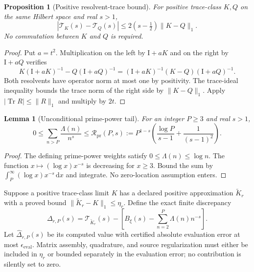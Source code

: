 \documentclass[11pt,letterpaper]{article}
\numberwithin{equation}{section}
\newtheorem{proposition}[theorem]{Proposition}
\newtheorem{lemma}[theorem]{Lemma}
\theoremstyle{definition}
\theoremstyle{remark}
\newcommand{\Id}{\mathrm I}
\newcommand{\dd}{\,\mathrm d}
\DeclareMathOperator{\Tr}{Tr}
\begin{document}
\begin{proposition}[Positive resolvent-trace bound]
\label{prop:resolventbound}
For positive trace-class $K,Q$ on the same Hilbert space and real $s>1$,
\begin{equation}
 |\mathcal T_K(s)-\mathcal T_Q(s)|
 \leq2(s-\tfrac12)\|K-Q\|_1.
 \label{eq:resolventtracebound}
\end{equation}
No commutation between $K$ and $Q$ is required.
\end{proposition}
\begin{proof}
Put $a=t^2$. Multiplication on the left by $\Id+aK$ and on the right by $\Id+aQ$ verifies
\begin{equation}
 K(\Id+aK)^{-1}-Q(\Id+aQ)^{-1}
 =(\Id+aK)^{-1}(K-Q)(\Id+aQ)^{-1}.
 \label{eq:noncommutingresolvent}
\end{equation}
Both resolvents have operator norm at most one by positivity. The trace-ideal inequality bounds the trace norm of the right side by $\|K-Q\|_1$. Apply $|\Tr R|\leq\|R\|_1$ and multiply by $2t$.
\end{proof}

\begin{lemma}[Unconditional prime-power tail]
\label{lem:primetail}
For an integer $P\geq3$ and real $s>1$,
\begin{equation}
 0\leq\sum_{n>P}\frac{\Lambda(n)}{n^s}
 \leq \mathcal R_{\mathrm{pr}}(P,s)
 :=P^{1-s}\left(\frac{\log P}{s-1}+\frac1{(s-1)^2}\right).
 \label{eq:primetail}
\end{equation}
\end{lemma}
\begin{proof}
The defining prime-power weights satisfy $0\leq\Lambda(n)\leq\log n$. The function $x\mapsto(\log x)x^{-s}$ is decreasing for $x\geq3$. Bound the sum by $\int_P^\infty(\log x)x^{-s}\dd x$ and integrate. No zero-location assumption enters.
\end{proof}

Suppose a positive trace-class limit $K$ has a declared positive approximation $\widetilde K_r$ with a proved bound $\|\widetilde K_r-K\|_1\leq\eta_r$. Define the exact finite discrepancy
\begin{equation}
 \Delta_{r,P}(s)=\mathcal T_{\widetilde K_r}(s)
 -\left[B_\xi(s)-\sum_{n=2}^{P}\Lambda(n)n^{-s}\right].
 \label{eq:finitediscrepancy}
\end{equation}
Let $\widehat\Delta_{r,P}(s)$ be its computed value with certified absolute evaluation error at most $\epsilon_{\mathrm{eval}}$. Matrix assembly, quadrature, and source regularization must either be included in $\eta_r$ or bounded separately in the evaluation error; no contribution is silently set to zero.
\end{document}
